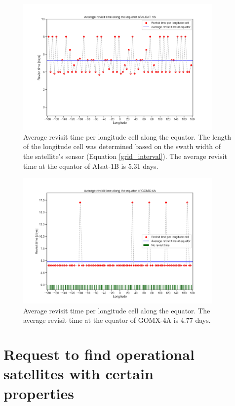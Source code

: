 \begin{figure}
\centering
\includegraphics[width=0.9\textwidth]{Images/revisit_time_of_ALSAT_1B.png}\caption{Average revisit time per longitude cell along the equator. The length of the longitude cell was determined based on the swath width of the satellite's sensor (Equation \ref{grid_interval}). The average revisit time at the equator of Alsat-1B is 5.31 days.}
\label{revisit_time_of_ALSAT 1B}
\end{figure}

\begin{figure}
\centering
\includegraphics[width=0.9\textwidth]{Images/revisit_time_of_GOMX-4A.png}
\caption{Average revisit time per longitude cell along the equator. The average revisit time at the equator of GOMX-4A is 4.77 days.}
\label{revisit_time_of_GOMX-4A}
\end{figure}

\bigskip
\section{Request to find operational satellites with certain \\properties}
\bigskip

